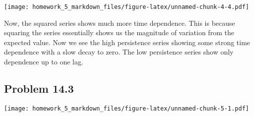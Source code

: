 \documentclass[]{article}
\newenvironment{Shaded}{\begin{snugshade}}{\end{snugshade}}
\newcommand{\KeywordTok}[1]{\textcolor[rgb]{0.13,0.29,0.53}{\textbf{#1}}}
\newcommand{\DataTypeTok}[1]{\textcolor[rgb]{0.13,0.29,0.53}{#1}}
\newcommand{\StringTok}[1]{\textcolor[rgb]{0.31,0.60,0.02}{#1}}
\newcommand{\CommentTok}[1]{\textcolor[rgb]{0.56,0.35,0.01}{\textit{#1}}}
\newcommand{\OperatorTok}[1]{\textcolor[rgb]{0.81,0.36,0.00}{\textbf{#1}}}
\newcommand{\NormalTok}[1]{#1}
\begin{document}
\texttt{[image: homework\_5\_markdown\_files/figure-latex/unnamed-chunk-4-4.pdf]}

Now, the squared series shows much more time dependence. This is because
squaring the series essentially shows us the magnitude of variation from
the expected value. Now we see the high persistence series showing some
strong time dependence with a slow decay to zero. The low persistence
series show only dependence up to one lag.

\subsection{Problem 14.3}\label{problem-14.3}

\begin{Shaded}
\end{Shaded}

\texttt{[image: homework\_5\_markdown\_files/figure-latex/unnamed-chunk-5-1.pdf]}
\end{document}
